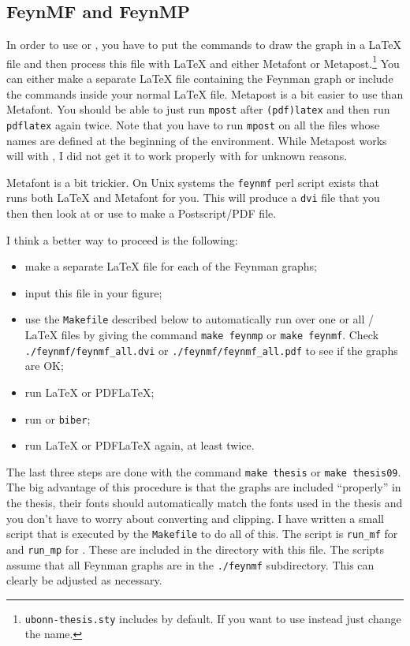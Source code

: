 \subsection{FeynMF and FeynMP}
\label{sec:fig:feynman:feynmf}

In order to use  or , you have to put
the commands to draw the graph in a \LaTeX{} file and then process
this file with \LaTeX{} and either Metafont or
Metapost.\footnote{\texttt{ubonn-thesis.sty} includes 
  by default. If you want to use  instead just change
  the name.}  You can either make a separate \LaTeX{} file containing
the Feynman graph or include the commands inside your normal \LaTeX
file.
Metapost is a bit
easier to use than Metafont.
You should be able to just run
\texttt{mpost} after \texttt{(pdf)latex} and then run
\texttt{pdflatex} again twice. Note that you have to run
\texttt{mpost} on all the files whose names are defined at the beginning
of the  environment. While Metapost works will with
, I did not get it to work properly with 
for unknown reasons.

Metafont is a bit trickier. On Unix systems the
\texttt{feynmf} perl script exists that runs both \LaTeX{} and
Metafont for you. This will produce a \texttt{dvi} file that you then
then look at or use to make a Postscript/PDF file.

I think a better way to proceed is the following:
\begin{itemize}
\item make a separate \LaTeX{} file for each of the Feynman graphs;
\item input this file in your figure;
\item use the \texttt{Makefile} described below to automatically run
  over one or all / \LaTeX{} files by giving the
  command \texttt{make feynmp} or \texttt{make feynmf}. Check
  \texttt{./feynmf/feynmf\_all.dvi} or
  \texttt{./feynmf/feynmf\_all.pdf} to see if the graphs are OK;
\item run \LaTeX{} or PDF\LaTeX;
\item run \BibTeX{} or \texttt{biber};
\item run \LaTeX{} or PDF\LaTeX{} again, at least twice.
\end{itemize}
The last three steps are done with the command \texttt{make thesis} or
\texttt{make thesis09}.
The big advantage of this procedure is that the graphs are included
\enquote{properly} in the thesis, their fonts should automatically
match the fonts used in the thesis and you don't have to worry about
converting and clipping. I have written a small script that is
executed by the \texttt{Makefile} to do all of this.
The script is \texttt{run\_mf} for  and
\texttt{run\_mp} for . These are
included in the directory with this file.
The scripts assume that all Feynman
graphs are in the \texttt{./feynmf} subdirectory. This can clearly be
adjusted as necessary.

